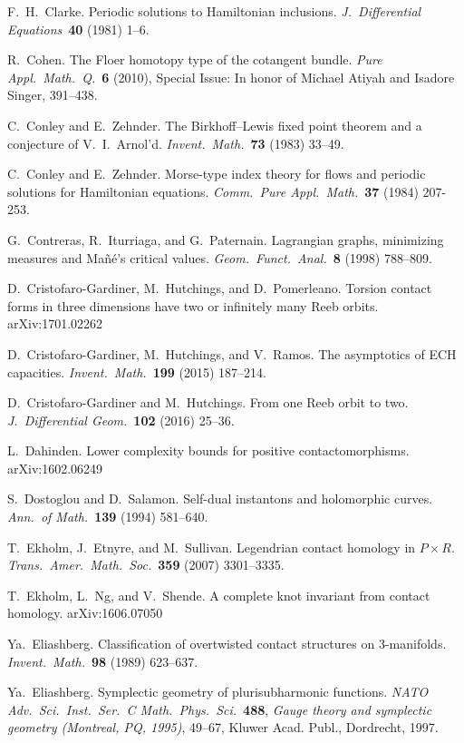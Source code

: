 \documentclass[12pt,twoside]{amsart}
\theoremstyle{plain}
\numberwithin{figure}{section}
\numberwithin{equation}{section}
\begin{document}
\begin{thebibliography}{999}
F.\ H.\ Clarke. 
Periodic solutions to Hamiltonian inclusions.
{\it J.\ Differential Equations}~{\bf 40} (1981) 1--6. 

R.\ Cohen.
The Floer homotopy type of the cotangent bundle. 
{\it Pure Appl.\ Math.\ Q.}~{\bf  6} (2010), 
Special Issue: In honor of Michael Atiyah and Isadore Singer, 391--438. 

C.\ Conley and E.\ Zehnder.
The Birkhoff--Lewis fixed point theorem and a conjecture of V.\ I.\ Arnol'd. 
{\it Invent.\ Math.}~{\bf 73} (1983) 33--49.

C.\ Conley and E.\ Zehnder.
Morse-type index theory for flows and periodic solutions for Hamiltonian equations.
{\it Comm.\ Pure Appl.\ Math.}~{\bf 37} (1984) 207-253.

G.\ Contreras, R.\ Iturriaga, and G.\ Paternain.
Lagrangian graphs, minimizing measures and Ma\~n\'e's critical values. 
{\it Geom.\ Funct.\ Anal.}~{\bf 8} (1998) 788--809. 

D.\ Cristofaro-Gardiner, M.\ Hutchings, and D.\ Pomerleano.
Torsion contact forms in three dimensions have two or infinitely many Reeb orbits.
arXiv:1701.02262 

D.\ Cristofaro-Gardiner, M.\ Hutchings, and V.\ Ramos. 
The asymptotics of ECH capacities. 
{\it Invent.\ Math.}~{\bf 199} (2015) 187--214.

D.\ Cristofaro-Gardiner and M.\ Hutchings.
From one Reeb orbit to two. 
{\it J.\ Differential Geom.}~{\bf 102} (2016) 25--36. 
   
L.\ Dahinden. 
Lower complexity bounds for positive contactomorphisms.
arXiv:1602.06249 

S.\ Dostoglou and D.\ Salamon.
Self-dual instantons and holomorphic curves. 
{\it Ann.\ of Math.}~{\bf 139} (1994) 581--640.

T.\ Ekholm, J.\ Etnyre, and M.\ Sullivan. 
Legendrian contact homology in $P \times R$. 
{\it Trans.\ Amer.\ Math.\ Soc.}~{\bf 359} (2007) 3301--3335.

T.\ Ekholm, L.\ Ng, and V.\ Shende. 
A complete knot invariant from contact homology.
arXiv:1606.07050 

Ya.\ Eliashberg. 
Classification of overtwisted contact structures on 3-manifolds. 
{\it Invent.\ Math.}~{\bf 98} (1989) 623--637.

Ya.\ Eliashberg.
Symplectic geometry of plurisubharmonic functions.
{\it NATO Adv.\ Sci.\ Inst.\ Ser.\ C Math.\ Phys.\ Sci.}~{\bf 488}, 
{\it Gauge theory and symplectic geometry (Montreal, PQ, 1995)}, 49--67, Kluwer Acad. Publ., Dordrecht, 1997. 


\end{thebibliography}
\end{document}
